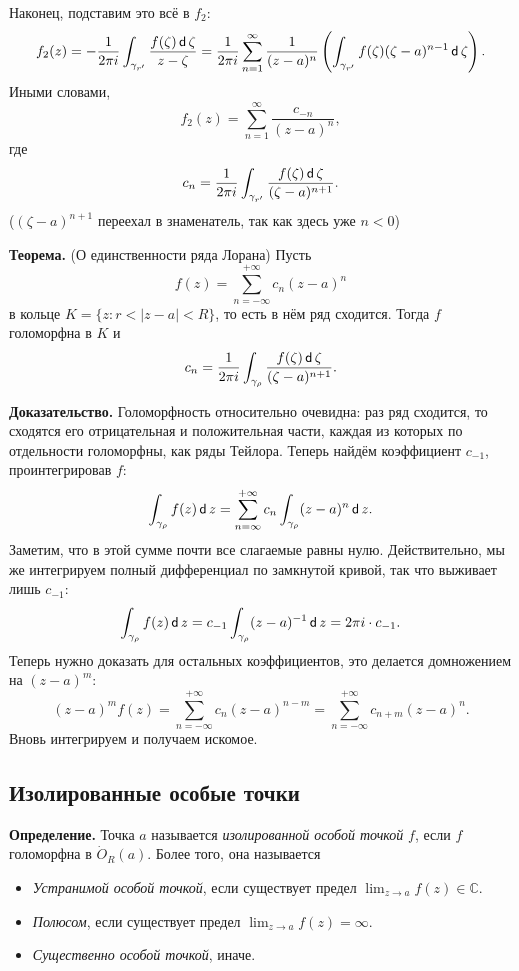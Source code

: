 Наконец, подставим это всё в $f_2$:
\[
    f_2(z) = - \frac{1}{2\pi i} \int_{\gamma_{r'}} \frac{f(\zeta) \operatorname{\mathsf d} \zeta}{z - \zeta} = \frac{1}{2\pi i} \sum_{n=1}^{\infty} \frac{1}{(z - a)^n} \left( \int_{\gamma_{r'}} f(\zeta) (\zeta - a)^{n-1} \operatorname{\mathsf d} \zeta \right).
\]
Иными словами,
\[
    f_2(z) = \sum_{n=1}^{\infty} \frac{c_{-n}}{(z - a)^n},
\]
где
\[
    c_{n} = \frac{1}{2\pi i} \int_{\gamma_{r'}} \frac{f(\zeta) \operatorname{\mathsf d} \zeta}{(\zeta - a)^{n+1}}.
\]
($(\zeta - a)^{n+1}$ переехал в знаменатель, так как здесь уже $n < 0$)

\QED

\textbf{Теорема.} (О единственности ряда Лорана) Пусть
\[
    f(z) = \sum_{n=-\infty}^{+\infty} c_n(z - a)^n
\]
в кольце $K = \{z: r < |z - a| < R\}$, то есть в нём ряд сходится.
Тогда $f$ голоморфна в $K$ и
\[
    c_n = \frac{1}{2\pi i} \int_{\gamma_{\rho}} \frac{f(\zeta) \operatorname{\mathsf d} \zeta}{(\zeta - a)^{n+1}}.
\]

\textbf{Доказательство.} Голоморфность относительно очевидна: раз ряд сходится, то сходятся его отрицательная и положительная части, каждая из которых по отдельности голоморфны, как ряды Тейлора.
Теперь найдём коэффициент $c_{-1}$, проинтегрировав $f$:
\[
    \int_{\gamma_\rho} f(z) \operatorname{\mathsf d} z = \sum_{n=\infty}^{+\infty} c_n \int_{\gamma_\rho} (z - a)^n \operatorname{\mathsf d} z.
\]
Заметим, что в этой сумме почти все слагаемые равны нулю.
Действительно, мы же интегрируем полный дифференциал по замкнутой кривой, так что выживает лишь $c_{-1}$:
\[
    \int_{\gamma_\rho} f(z) \operatorname{\mathsf d} z = c_{-1} \int_{\gamma_\rho} (z - a)^{-1} \operatorname{\mathsf d} z = 2\pi i \cdot c_{-1}.
\]
Теперь нужно доказать для остальных коэффициентов, это делается домножением на $(z - a)^m$:
\[
    (z - a)^m f(z) = \sum_{n=-\infty}^{+\infty} c_n(z - a)^{n - m} = \sum_{n=-\infty}^{+\infty} c_{n+m} (z - a)^n.
\]
Вновь интегрируем и получаем искомое.

\QED

\subsection{Изолированные особые точки}
\textbf{Определение.} Точка $a$ называется \textit{изолированной особой точкой} $f$, если $f$ голоморфна в $\dot O_R(a)$.
Более того, она называется
\begin{itemize}
    \item \textit{Устранимой особой точкой}, если существует предел $\lim_{z \to a} f(z) \in \mathbb C$.
    \item \textit{Полюсом}, если существует предел $\lim_{z \to a} f(z) = \infty$.
    \item \textit{Существенно особой точкой}, иначе.
\end{itemize}

